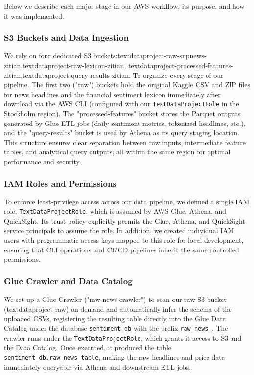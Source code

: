 \documentclass[11pt,a4paper]{article}
\begin{document}
Below we describe each major stage in our AWS workflow, its purpose, and how it was implemented.

\subsubsection{S3 Buckets and Data Ingestion}

We rely on four dedicated S3 buckets:textdataproject-raw-snpnews-zitian,textdataproject-raw-lexicon-zitian, textdataproject-processed-features-zitian,textdataproject-query-results-zitian. To organize every stage of our pipeline. The first two ("raw") buckets hold the original Kaggle CSV and ZIP files for news headlines and the financial sentiment lexicon immediately after download via the AWS CLI (configured with our \texttt{TextDataProjectRole} in the Stockholm region). The "processed-features" bucket stores the Parquet outputs generated by Glue ETL jobs (daily sentiment metrics, tokenized headlines, etc.), and the "query-results" bucket is used by Athena as its query staging location. This structure ensures clear separation between raw inputs, intermediate feature tables, and analytical query outputs, all within the same region for optimal performance and security.  


\subsubsection{IAM Roles and Permissions}

To enforce least-privilege access across our data pipeline, we defined a single IAM role, \texttt{TextDataProjectRole}, which is assumed by AWS Glue, Athena, and QuickSight. Its trust policy explicitly permits the Glue, Athena, and QuickSight service principals to assume the role. In addition, we created individual IAM users with programmatic access keys mapped to this role for local development, ensuring that CLI operations and CI/CD pipelines inherit the same controlled permissions.  


\subsubsection{Glue Crawler and Data Catalog}

We set up a Glue Crawler ("raw-news-crawler") to scan our raw S3 bucket (textdataproject‐raw) on demand and automatically infer the schema of the uploaded CSVs, registering the resulting table directly into the Glue Data Catalog under the database \texttt{sentiment\_db} with the prefix \texttt{raw\_news\_}. The crawler runs under the \texttt{TextDataProjectRole}, which grants it access to S3 and the Data Catalog. Once executed, it produced the table \texttt{sentiment\_db.raw\_news\_table}, making the raw headlines and price data immediately queryable via Athena and downstream ETL jobs.  
\end{document}
